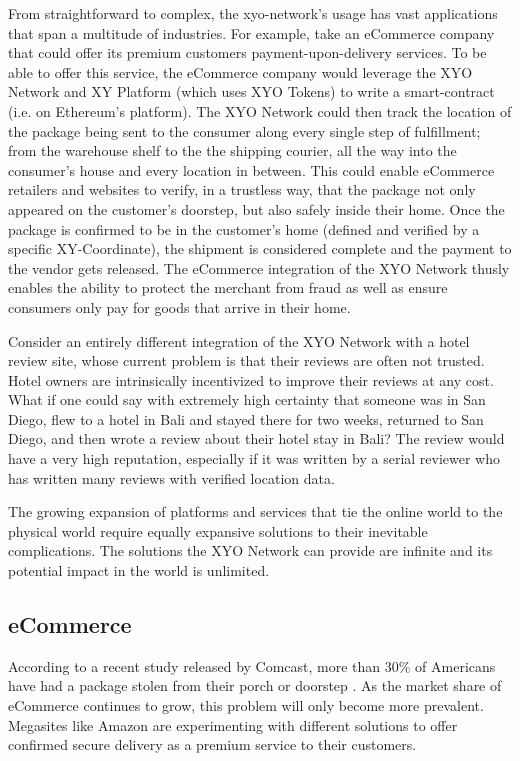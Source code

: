 \documentclass{article}
\begin{document}
From straightforward to complex, the \Gls{xyo-network}'s usage  has vast applications that span a multitude of industries. For example, take an eCommerce company that could offer its premium customers payment-upon-delivery services. To be able to offer this service, the eCommerce company would leverage the XYO Network and XY Platform (which uses XYO Tokens) to write a \gls{smart-contract} (i.e. on Ethereum's platform). The XYO Network could then track the location of the package being sent to the consumer along every single step of fulfillment; from the warehouse shelf to the the shipping courier, all the way into the consumer's house and every location in between. This could enable eCommerce retailers and websites to verify, in a \gls{trustless} way, that the package not only appeared on the customer's doorstep, but also safely inside their home. Once the package is confirmed to be in the customer's home (defined and verified by a specific XY-Coordinate), the shipment is considered complete and the payment to the vendor gets released. The eCommerce integration of the XYO Network thusly enables the ability to protect the merchant from fraud as well as ensure consumers only pay for goods that arrive in their home.

Consider an entirely different integration of the XYO Network with a hotel review site, whose current problem is that their reviews are often not trusted. Hotel owners are intrinsically incentivized to improve their reviews at any cost. What if one could say with extremely high \gls{certainty} that someone was in San Diego, flew to a hotel in Bali and stayed there for two weeks, returned to San Diego, and then wrote a review about their hotel stay in Bali? The review would have a very high reputation, especially if it was written by a serial reviewer who has written many reviews with verified location data.

The growing expansion of platforms and services that tie the online world to the physical world require equally expansive solutions to their inevitable complications. The solutions the XYO Network can provide are infinite and its potential impact in the world is unlimited.

\subsection{eCommerce}

According to a recent study released by Comcast, more than 30\% of Americans have had a package stolen from their porch or doorstep \cite{comcast-packagesurvey}. As the market share of eCommerce continues to grow, this problem will only become more prevalent. Megasites like Amazon are experimenting with different solutions to offer confirmed secure delivery as a premium service to their customers.
\end{document}
